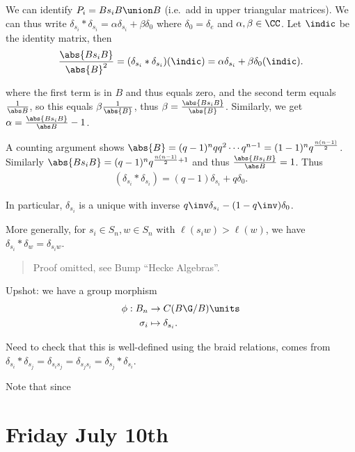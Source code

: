We can identify \(P_i = Bs_i B \union B\) (i.e.~add in upper triangular
matrices). We can thus write
\(\delta_{s_i} \ast \delta_{s_i} = \alpha \delta_{s_i} + \beta \delta_0\)
where \(\delta_0 = \delta_e\) and \(\alpha, \beta \in \CC\). Let
\(\indic\) be the identity matrix, then \begin{align*}
{\abs{Bs_i B} \over \abs{B}^2} = (\delta_{s_i} \ast \delta_{s_i})(\indic) = \alpha \delta_{s_i} + \beta \delta_0(\indic)
.\end{align*}

where the first term is in \(B\) and thus equals zero, and the second
term equals \(1\over \abs B\), so this equals \(\beta{1\over \abs{B}}\),
thus \(\beta = {\abs{Bs_i B} \over \abs{B} }\). Similarly, we get
\(\alpha = {\abs{Bs_i B} \over \abs B} - 1\).

A counting argument shows
\(\abs{B} = (q-1)^n q q^2 \cdots q^{n-1} = (1-1)^n q^{n(n-1) \over 2}\).
Similarly \(\abs{Bs_i B} = (q-1)^n q^{{n(n-1) \over 2} + 1}\) and thus
\({\abs{Bs_i B} \over \abs B} = 1\). Thus \begin{align*}
(\delta_{s_i} \ast \delta_{s_i}) = (q-1) \delta_{s_i} + q\delta_0
.\end{align*}

In particular, \(\delta_{s_i}\) is a unique with inverse
\(q\inv \delta_{s_i} - (1-q\inv) \delta_0\).

More generally, for \(s_i \in S_n, w\in S_n\) with
\(\ell(s_i w) > \ell(w)\), we have
\(\delta_{s_i} \ast \delta_w = \delta_{s_i w}\).

\begin{quote}
Proof omitted, see Bump ``Hecke Algebras''.
\end{quote}

Upshot: we have a group morphism \begin{align*}
\phi: B_n &\to C(B\G/B)\units \\
\sigma_i &\mapsto \delta_{s_i}
.\end{align*}

Need to check that this is well-defined using the braid relations, comes
from
\(\delta_{s_i} \ast \delta_{s_j} = \delta_{s_i s_j} = \delta_{s_j s_i} = \delta_{s_j} \ast \delta_{s_i}\).

Note that since

\hypertarget{friday-july-10th}{%
\section{Friday July 10th}\label{friday-july-10th}}

